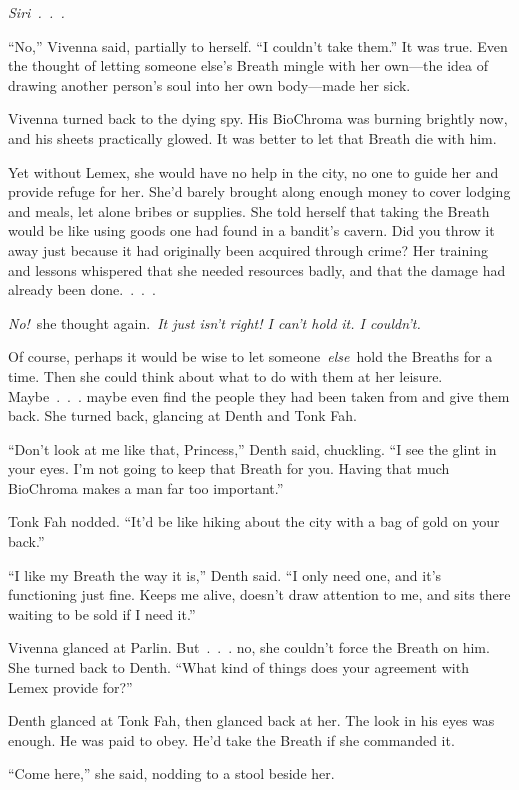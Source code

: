 \textit{Siri~.~.~.}

“No,” Vivenna said, partially to herself. “I couldn’t take them.” It was true. Even the thought of letting someone else’s Breath mingle with her own—the idea of drawing another person’s soul into her own body—made her sick.

Vivenna turned back to the dying spy. His BioChroma was burning brightly now, and his sheets practically glowed. It was better to let that Breath die with him.

Yet without Lemex, she would have no help in the city, no one to guide her and provide refuge for her. She’d barely brought along enough money to cover lodging and meals, let alone bribes or supplies. She told herself that taking the Breath would be like using goods one had found in a bandit’s cavern. Did you throw it away just because it had originally been acquired through crime? Her training and lessons whispered that she needed resources badly, and that the damage had already been done.~.~.~.

\textit{No!}~she thought again.~\textit{It just isn’t right! I can’t hold it. I couldn’t.}

Of course, perhaps it would be wise to let someone~\textit{else}~hold the Breaths for a time. Then she could think about what to do with them at her leisure. Maybe~.~.~. maybe even find the people they had been taken from and give them back. She turned back, glancing at Denth and Tonk Fah.

“Don’t look at me like that, Princess,” Denth said, chuckling. “I see the glint in your eyes. I’m not going to keep that Breath for you. Having that much BioChroma makes a man far too important.”

Tonk Fah nodded. “It’d be like hiking about the city with a bag of gold on your back.”

“I like my Breath the way it is,” Denth said. “I only need one, and it’s functioning just fine. Keeps me alive, doesn’t draw attention to me, and sits there waiting to be sold if I need it.”

Vivenna glanced at Parlin. But~.~.~. no, she couldn’t force the Breath on him. She turned back to Denth. “What kind of things does your agreement with Lemex provide for?”

Denth glanced at Tonk Fah, then glanced back at her. The look in his eyes was enough. He was paid to obey. He’d take the Breath if she commanded it.

“Come here,” she said, nodding to a stool beside her.

